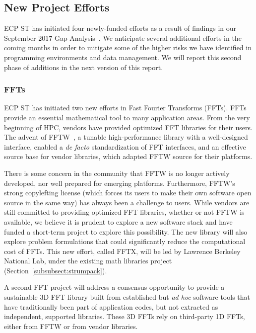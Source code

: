 \subsection{New Project Efforts}
ECP ST has initiated four newly-funded efforts as a result of findings in our September 2017 Gap Analysis~\cite{Thakur2017GapAnalysis}.  We anticipate several additional efforts in the coming months in order to mitigate some of the higher risks we have identified in programming environments and data management.  We will report this second phase of additions in the next version of this report.

\subsubsection{FFTs}\label{subsubsect:ffts}
ECP ST has initiated two new efforts in Fast Fourier Transforms (FFTs).  FFTs provide an essential mathematical tool to many application areas.  From the very beginning of HPC, vendors have provided optimized FFT libraries for their users.  The advent of FFTW~\cite{FFTW05}, a tunable high-performance library with a well-designed interface, enabled a \textit{de facto} standardization of FFT interfaces, and an effective source base for vendor libraries, which adapted FFTW source for their platforms.

There is some concern in the community that FFTW is no longer actively developed, nor well prepared for emerging platforms.  Furthermore, FFTW's strong copylefting license (which forces its users to make their own software open source in the same way) has always been a challenge to users.  While vendors are still committed to providing optimized FFT libraries, whether or not FFTW is available, we believe it is prudent to explore a new software stack and have funded a short-term project to explore this possibility.  The new library will also explore problem formulations that could significantly reduce the computational cost of FFTs.  This new effort, called FFTX, will be led by Lawrence Berkeley National Lab, under the existing math libraries project (Section~\ref{subsubsect:strumpack}).

A second FFT project will address a consensus opportunity to provide a sustainable 3D FFT library built from established but \textit{ad hoc} software tools that have traditionally been part of application codes, but not extracted as independent, supported libraries.  These 3D FFTs rely on third-party 1D FFTs, either from FFTW or from vendor libraries.


